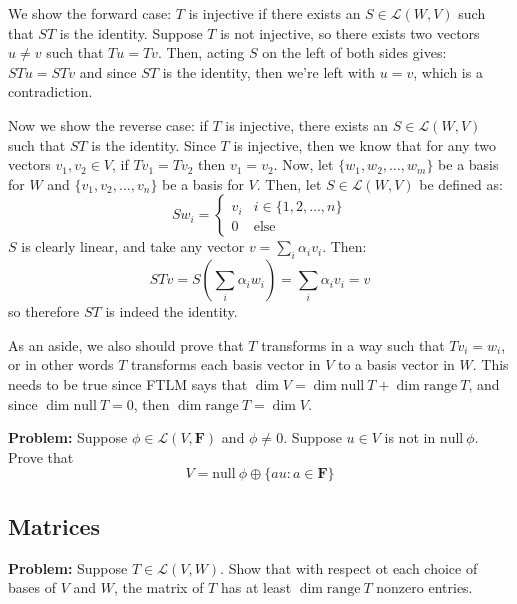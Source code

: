 \documentclass[10pt]{article}
\newcommand{\F}{\mathbf F}
\newcommand{\range}{\mathrm{range \ }}
\renewcommand{\null}{\mathrm{null \ }}
\newenvironment{problem}{\textbf{Problem:}}{}
\begin{document}
	\begin{solution}
		We show the forward case: \( T \) is injective if there exists an \( S \in \mathcal L(W, V) \) such that 
		\( ST  \) is the identity. Suppose \( T \) is not injective, so there exists two vectors \( u \neq v \) 
		such that \( Tu = Tv \). Then, acting \( S \) on the left of both sides gives:
		\( STu = STv \) and since \( ST \) is the identity, then we're left with \( u = v \), which is a contradiction. 

		Now we show the reverse case: if \( T \) is injective, there exists an \( S \in \mathcal L(W, V) \) such that 
		\( ST \) is the identity. Since  \( T \) is injective, then we know that for any two vectors 
		\( v_1, v_2 \in V \), if \( Tv_1 = Tv_2 \) then \( v_1 = v_2 \). Now, let \( \{w_1, w_2, \dots, w_m\}  \)
		be a basis for \( W \) and \( \{v_1, v_2, \dots, v_n\}  \) be a basis for \( V \). 
		Then, let \( S \in \mathcal L(W, V)\) be defined as:
		\[
		S w_i = \begin{cases}
			v_i & i \in \{1, 2, \dots, n\}\\
			0 & \text{else}
		\end{cases}
		\] 
		\( S \) is clearly linear, and take any vector \( v = \sum_i \alpha_i v_i \). Then:
		\[
		STv = S\left( \sum_i \alpha_i w_i \right) = \sum_i \alpha_i v_i = v
		\] 
		so therefore \( ST  \) is indeed the identity.

		As an aside, we also should prove that 
		\( T \) transforms in a way such that \( Tv_i = w_i \), or in other words \( T \) transforms 
		each basis vector in \( V \) to a basis vector in \( W \). This needs to be true since FTLM
		says that \( \dim V = \dim \null T + \dim \range T \), and since \( \dim \null T = 0 \), then 
		\( \dim \range T = \dim V \). 
	\end{solution}
	\begin{problem}
		Suppose \( \phi \in \mathcal L(V, \F) \) and \( \phi \neq 0 \). Suppose \( u \in V \) is not in 
		\( \null \phi \). Prove that
		\[
		V = \null \phi \oplus \{au : a \in \F \} 
		\] 
	\end{problem}

	\subsection{Matrices}

	\begin{problem}
		Suppose \( T \in \mathcal L(V, W) \). Show that with respect ot each choice of bases of  \( V \) and \( W \), 
		the matrix of \( T \) has at least \( \dim \range T \) nonzero entries. 
	\end{problem}
	
\end{document}
